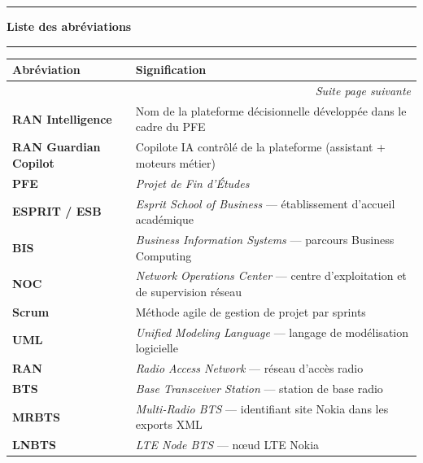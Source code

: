 \documentclass[12pt,a4paper]{report}
\begin{document}
\thispagestyle{plain}
\vspace*{1.2cm}
\noindent\hspace*{1.25cm}\begin{minipage}[c]{0.06\textwidth}\color{black}\rule{0.42cm}{1.25cm}\end{minipage}\hspace{-0.15cm}%
\begin{minipage}[c]{0.75\textwidth}{\LARGE\bfseries Liste des abréviations}\\[-0.15cm]\rule{0.78\textwidth}{0.5pt}\end{minipage}
\vspace{1.0cm}
\renewcommand{\arraystretch}{1.28}
\small
\begin{longtable}{@{}p{3.4cm}p{10.3cm}@{}}
\toprule
\textbf{Abréviation} & \textbf{Signification} \\
\midrule
\endhead
\multicolumn{2}{r}{\textit{Suite page suivante}} \\
\midrule
\endfoot
\bottomrule
\endlastfoot
\textbf{RAN Intelligence} & Nom de la plateforme décisionnelle développée dans le cadre du PFE \\
\textbf{RAN Guardian Copilot} & Copilote IA contrôlé de la plateforme (assistant + moteurs métier) \\
\textbf{PFE} & \textit{Projet de Fin d'Études} \\
\textbf{ESPRIT / ESB} & \textit{Esprit School of Business} — établissement d'accueil académique \\
\textbf{BIS} & \textit{Business Information Systems} — parcours Business Computing \\
\textbf{NOC} & \textit{Network Operations Center} — centre d'exploitation et de supervision réseau \\
\textbf{Scrum} & Méthode agile de gestion de projet par sprints \\
\textbf{UML} & \textit{Unified Modeling Language} — langage de modélisation logicielle \\
\textbf{RAN} & \textit{Radio Access Network} — réseau d'accès radio \\
\textbf{BTS} & \textit{Base Transceiver Station} — station de base radio \\
\textbf{MRBTS} & \textit{Multi-Radio BTS} — identifiant site Nokia dans les exports XML \\
\textbf{LNBTS} & \textit{LTE Node BTS} — nœud LTE Nokia \\

\end{longtable}
\end{document}
